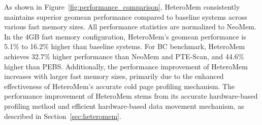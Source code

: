 



As shown in Figure~\ref{fig:performance_comparison}, HeteroMem consistently maintains superior geomean performance compared to baseline systems across various fast memory sizes. All performance statistics are normalized to NeoMem. In the 4GB fast memory configuration, HeteroMem's geomean performance is 5.1\% to 16.2\% higher than baseline systems. For BC benchmark, HeteroMem achieves 32.7\% higher performance than NeoMem and PTE-Scan, and 44.6\% higher than PEBS. 
Additionally, the performance improvement of HeteroMem increases with larger fast memory sizes, primarily due to the enhanced effectiveness of HeteroMem's accurate cold page profiling mechanism.
The performance improvement of HeteroMem stems from its accurate hardware-based profiling method and efficient hardware-based data movement mechanism, as described in Section~\ref{sec:heteromem}. 



